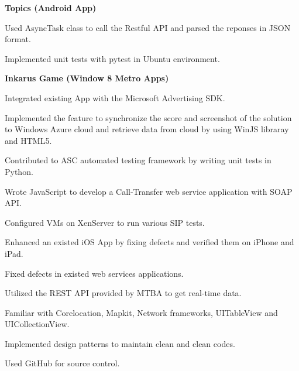 \documentclass[a4paper]{lyu-resume} %
\begin{document}
\begin{minipage}[t]{0.66\textwidth}
\textbf{Topics (Android App)}
\begin{tightitemize}
\item Used AsyncTask class to call the Restful API and parsed the reponses in JSON format.
\item Implemented unit tests with pytest in Ubuntu environment.
\end{tightitemize}

\vspace{2 mm}
\textbf{Inkarus Game (Window 8 Metro Apps)}
\begin{tightitemize}
\item Integrated existing App with the Microsoft Advertising SDK.
\item Implemented the feature to synchronize the score and screenshot of the solution to Windows Azure cloud and retrieve data from cloud by using WinJS libraray and HTML5.
\end{tightitemize}

\sectionspace %



\begin{tightitemize}
\item Contributed to ASC automated testing framework by writing unit tests in Python.
\item Wrote JavaScript to develop a Call-Transfer web service application with SOAP API.
\item Configured VMs on XenServer to run various SIP tests.
\item Enhanced an existed iOS App by fixing defects and verified them on iPhone and iPad. 
\item Fixed defects in existed web services applications.
\end{tightitemize}


\begin{tightitemize}
\item Utilized the REST API provided by MTBA to get real-time data.
\item Familiar with Corelocation, Mapkit, Network frameworks, UITableView and UICollectionView.
\item Implemented design patterns to maintain clean and clean codes.
\item Used GitHub for source control.
\end{tightitemize}


\end{minipage}
\end{document}
